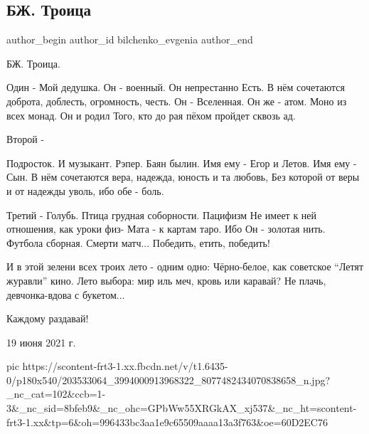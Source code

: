  
 
 
 
 
 
\subsection{БЖ. Троица}
\label{sec:19_06_2021.fb.bilchenko_evgenia.1.troica}
\ifcmt
 author_begin
   author_id bilchenko_evgenia
 author_end
\fi

БЖ. Троица.

Один - Мой дедушка. Он - военный. Он непрестанно Есть.
В нём сочетаются доброта, доблесть, огромность, честь.
Он - Вселенная. Он же - атом. Моно из всех монад.
Он и родил Того, кто до рая пёхом пройдет сквозь ад.

Второй - 

Подросток. И музыкант. Рэпер. Баян былин.
Имя ему - Егор и Летов. Имя ему - Сын.
В нём сочетаются вера, надежда, юность и та любовь,
Без которой от веры и от надежды уволь, ибо обе - боль.

Третий -
Голубь. Птица грудная соборности. Пацифизм
Не имеет к ней отношения, как уроки физ-
Мата - к картам таро. Ибо Он - золотая нить.
Футбола сборная. Смерти матч... Победить, етить, победить!

И в этой зелени всех троих лето - одним одно:
Чёрно-белое, как советское \enquote{Летят журавли} кино.
Лето выбора: мир иль меч, кровь или каравай?
Не плачь, девчонка-вдова с букетом...

Каждому раздавай! 

19 июня 2021 г.

\ifcmt
  pic https://scontent-frt3-1.xx.fbcdn.net/v/t1.6435-0/p180x540/203533064_3994000913968322_8077482434070838658_n.jpg?_nc_cat=102&ccb=1-3&_nc_sid=8bfeb9&_nc_ohc=GPbWw55XRGkAX_xj537&_nc_ht=scontent-frt3-1.xx&tp=6&oh=996433bc3aa1e9c65509aaaa13a3f763&oe=60D2EC76
\fi

